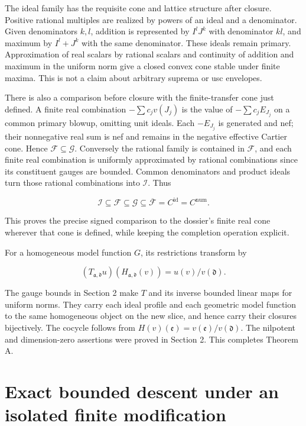 \documentclass[11pt]{article}
\begin{document}
The ideal family has the requisite cone and lattice structure after closure. Positive rational multiples are realized by powers of an ideal and a denominator. Given denominators \(k,l\), addition is represented by \(I^lJ^k\) with denominator \(kl\), and maximum by \(I^l+J^k\) with the same denominator. These ideals remain primary. Approximation of real scalars by rational scalars and continuity of addition and maximum in the uniform norm give a closed convex cone stable under finite maxima. This is not a claim about arbitrary suprema or usc envelopes.

There is also a comparison before closure with the finite-transfer cone just defined. A finite real combination \(-\sum c_jv(J_j)\) is the value of \(-\sum c_jE_{J_j}\) on a common primary blowup, omitting unit ideals. Each \(-E_{J_j}\) is generated and nef; their nonnegative real sum is nef and remains in the negative effective Cartier cone. Hence \(\mathcal F\subseteq\mathcal G\). Conversely the rational family is contained in \(\mathcal F\), and each finite real combination is uniformly approximated by rational combinations since its constituent gauges are bounded. Common denominators and product ideals turn those rational combinations into \(\mathcal I\). Thus

\[
\mathcal I\subseteq\mathcal F\subseteq\mathcal G\subseteq
\overline{\mathcal F}=C^{\mathrm{id}}=C^{\mathrm{num}}.
\]

This proves the precise signed comparison to the dossier's finite real cone wherever that cone is defined, while keeping the completion operation explicit.

For a homogeneous model function \(G\), its restrictions transform by

\[
(T_{\mathfrak a,\mathfrak d}u)(H_{\mathfrak a,\mathfrak d}(v))
=u(v)/v(\mathfrak d). \tag{3}
\]

The gauge bounds in Section 2 make \(T\) and its inverse bounded linear maps for uniform norms. They carry each ideal profile and each geometric model function to the same homogeneous object on the new slice, and hence carry their closures bijectively. The cocycle follows from \(H(v)(\mathfrak e)=v(\mathfrak e)/v(\mathfrak d)\). The nilpotent and dimension-zero assertions were proved in Section 2. This completes Theorem A.

\section{Exact bounded descent under an isolated finite modification}
\end{document}
